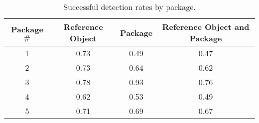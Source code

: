\begin{table}
\centering
\begin{tabular}{@{} *4c @{}}
\toprule
 \multicolumn{1}{c}{Package $\#$} & {Reference Object}  & {Package}  & {Reference Object and Package}  \\ 
\midrule
 1 & 0.73 & 0.49 & 0.47 \\ 
 2 & 0.73 & 0.64 & 0.62 \\
 3 & 0.78 & 0.93 & 0.76 \\
 4 & 0.62 & 0.53 & 0.49 \\
 5 & 0.71 & 0.69 & 0.67 \\
\bottomrule
 \end{tabular}
 \caption{Successful detection rates by package.}
\label{table:detection_by_package}
\end{table}